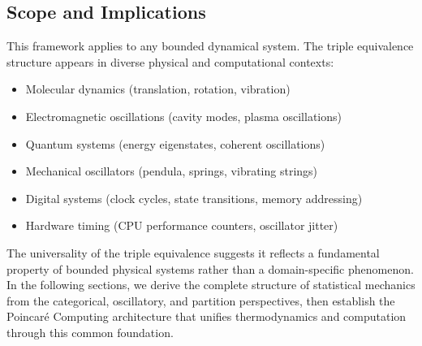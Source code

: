 \subsection{Scope and Implications}

This framework applies to any bounded dynamical system. The triple equivalence structure appears in diverse physical and computational contexts:
\begin{itemize}
\item Molecular dynamics (translation, rotation, vibration)
\item Electromagnetic oscillations (cavity modes, plasma oscillations)
\item Quantum systems (energy eigenstates, coherent oscillations)
\item Mechanical oscillators (pendula, springs, vibrating strings)
\item Digital systems (clock cycles, state transitions, memory addressing)
\item Hardware timing (CPU performance counters, oscillator jitter)
\end{itemize}

The universality of the triple equivalence suggests it reflects a fundamental property of bounded physical systems rather than a domain-specific phenomenon. In the following sections, we derive the complete structure of statistical mechanics from the categorical, oscillatory, and partition perspectives, then establish the Poincar\'e Computing architecture that unifies thermodynamics and computation through this common foundation.
